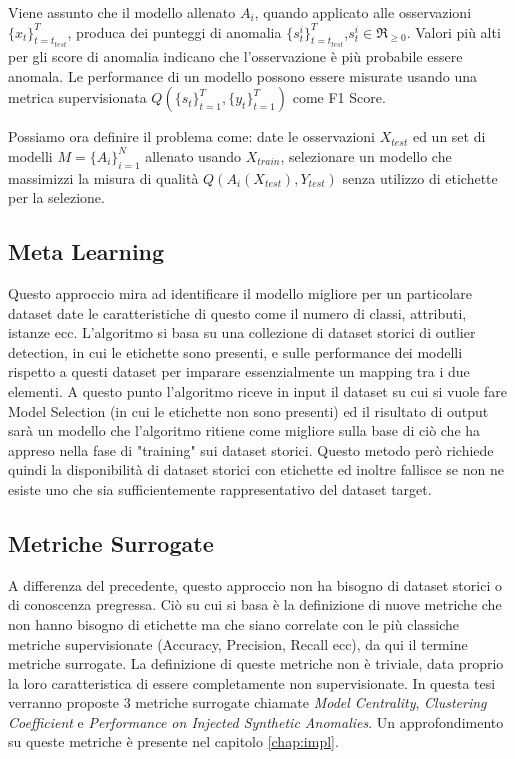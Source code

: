 Viene assunto che il modello allenato \(A_i\), quando applicato alle osservazioni \(\{x_t\}^{T}_{t=t_{test}}\), produca dei punteggi di anomalia \(\{s_t^i\}_{t=t_{test}}^T\),\(s^i_t\in\Re_{\geq0}\). Valori più alti per gli score di anomalia indicano che l'osservazione è più probabile essere anomala.
Le performance di un modello possono essere misurate usando una metrica supervisionata \(Q(\{s_t\}^T_{t=1},\{y_t\}^T_{t=1})\) come F1 Score.

Possiamo ora definire il problema come: date le osservazioni \(X_{test}\) ed un set di modelli \(M=\{A_i\}^N_{i=1}\) allenato usando \(X_{train}\), selezionare un modello che massimizzi la misura di qualità \(Q(A_i(X_{test}),Y_{test})\) senza utilizzo di etichette per la selezione.

\subsection{Meta Learning}
Questo approccio mira ad identificare il modello migliore per un particolare dataset date le caratteristiche di questo come il numero di classi, attributi, istanze ecc. L'algoritmo si basa su una collezione di dataset storici di outlier detection, in cui le etichette sono presenti, e sulle performance dei modelli rispetto a questi dataset per imparare essenzialmente un mapping tra i due elementi. 
A questo punto l'algoritmo riceve in input il dataset su cui si vuole fare Model Selection (in cui le etichette non sono presenti) ed il risultato di output sarà un modello che l'algoritmo ritiene come migliore sulla base di ciò che ha appreso nella fase di "training" sui dataset storici.
Questo metodo però richiede quindi la disponibilità di dataset storici con etichette ed inoltre fallisce se non ne esiste uno che sia sufficientemente rappresentativo del dataset target.
\subsection{Metriche Surrogate}
A differenza del precedente, questo approccio non ha bisogno di dataset storici o di conoscenza pregressa. Ciò su cui si basa è la definizione di nuove metriche che non hanno bisogno di etichette ma che siano correlate con le più classiche metriche supervisionate (Accuracy, Precision, Recall ecc)\cite{DBLP:journals/corr/abs-2104-01422}, da qui il termine metriche surrogate.
La definizione di queste metriche non è triviale, data proprio la loro caratteristica di essere completamente non supervisionate. In questa tesi verranno proposte 3 metriche surrogate chiamate \textit{Model Centrality}, \textit{Clustering Coefficient} e \textit{Performance on Injected Synthetic Anomalies}. Un approfondimento su queste metriche è presente nel capitolo \ref{chap:impl}.


